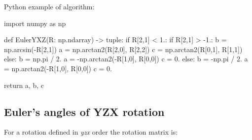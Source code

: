     Python example of algorithm:

\begin{python}

import numpy as np

def EulerYXZ(R: np.ndarray) -> tuple:
    if R[2,1] < 1.:
        if R[2,1] > -1.:
            b = np.arcsin(-R[2,1])
            a = np.arctan2(R[2,0], R[2,2])
            c = np.arctan2(R[0,1], R[1,1])
        else:
            b = np.pi / 2.
            a = -np.arctan2(-R[1,0], R[0,0])
            c = 0.
    else:
        b = -np.pi / 2.
        a = np.arctan2(-R[1,0], R[0,0])
        c = 0.

    return a, b, c
\end{python}

\subsection{Euler's angles of \textbf{YZX} rotation}

    For a rotation defined in \textit{yzx} order the rotation matrix is:

